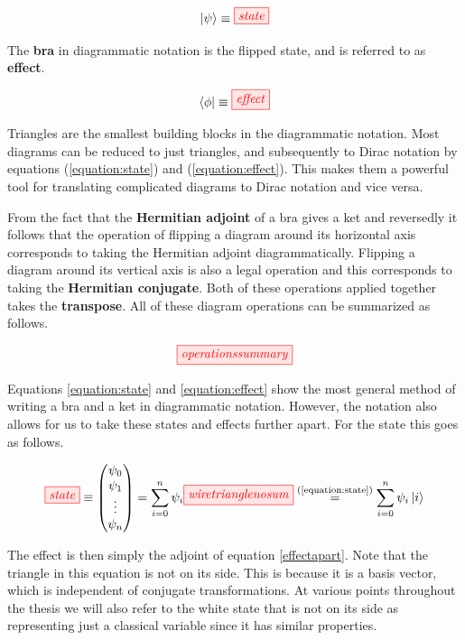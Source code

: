 \documentclass[]{article}
\newcommand{\equaltext}[1]{\ensuremath{\stackrel{\text{#1}}{=}}}
\begin{document}
\begin{equation}
\label{equation:state}
\ket{\psi} \equiv \tikzfig{state}
\end{equation}

The \textbf{bra} in diagrammatic notation is the flipped state, and is referred to as \textbf{effect}. 

\begin{equation}
\label{equation:effect}
\bra{\phi} \equiv \tikzfig{effect}
\end{equation}

Triangles are the smallest building blocks in the diagrammatic notation. Most diagrams can be reduced to just triangles, and subsequently to Dirac notation by equations (\ref{equation:state}) and (\ref{equation:effect}). This makes them a powerful tool for translating complicated diagrams to Dirac notation and vice versa.

From the fact that the \textbf{Hermitian adjoint} of a bra gives a ket and reversedly it follows that the operation of flipping a diagram around its horizontal axis corresponds to taking the Hermitian adjoint diagrammatically. Flipping a diagram around its vertical axis is also a legal operation and this corresponds to taking the \textbf{Hermitian conjugate}. Both of these operations applied together takes the \textbf{transpose}. All of these diagram operations can be summarized as follows.

\begin{equation}
\tikzfig{operationssummary}
\end{equation}

Equations \ref{equation:state} and \ref{equation:effect} show the most general method of writing a bra and a ket in diagrammatic notation. However, the notation also allows for us to take these states and effects further apart. For the state this goes as follows. 

\begin{equation}
\label{effectapart}
\tikzfig{state} \equiv
\begin{pmatrix}
\psi_0 \\
\psi_1 \\
\vdots \\
\psi_n
\end{pmatrix} = \sum\limits_{i=0}^{n} \psi_i \tikzfig{wiretrianglenosum} \equaltext{(\ref{equation:state})} \sum\limits_{i=0}^{n} \psi_i \ket{i}
\end{equation}

The effect is then simply the adjoint of equation \ref{effectapart}. Note that the triangle in this equation is not on its side. This is because it is a basis vector, which is independent of conjugate transformations. At various points throughout the thesis we will also refer to the white state that is not on its side as representing just a classical variable since it has similar properties. 
\end{document}
